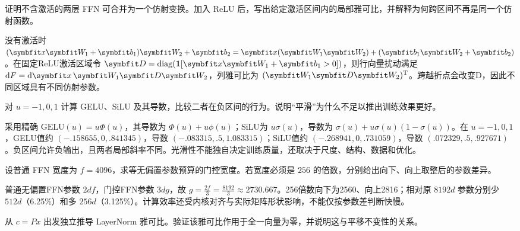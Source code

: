
\begin{exercises}
\begin{exercise} 证明不含激活的两层 FFN 可合并为一个仿射变换。加入 ReLU 后，写出给定激活区间内的局部雅可比，并解释为何跨区间不再是同一个仿射函数。

\begin{solution}
没有激活时 $(\vect{x}\mat{W}_1+\vect{b}_1)\mat{W}_2+\vect{b}_2=\vect{x}(\mat{W}_1\mat{W}_2)+(\vect{b}_1\mat{W}_2+\vect{b}_2)$。在固定ReLU激活区域令 $\mat{D}=\operatorname{diag}(\mathbf1[\vect{x}\mat{W}_1+\vect{b}_1>0])$，则行向量扰动满足 $\dif F=\dif \vect{x}\,\mat{W}_1\mat{D}\mat{W}_2$，列雅可比为 $(\mat{W}_1\mat{D}\mat{W}_2)^{\mathrm{T}}$。跨越折点会改变D，因此不同区域具有不同仿射参数。
\end{solution}
\end{exercise}

\begin{exercise} 对 $u=-1,0,1$ 计算 GELU、SiLU 及其导数，比较二者在负区间的行为。说明“平滑”为什么不足以推出训练效果更好。

\begin{solution}
采用精确 $\mathrm{GELU}(u)=u\Phi(u)$，其导数为 $\Phi(u)+u\phi(u)$；SiLU为 $u\sigma(u)$，导数为 $\sigma(u)+u\sigma(u)(1-\sigma(u))$。在 $u=-1,0,1$，GELU值约 $(-.158655,0,.841345)$，导数 $(-.083315,.5,1.083315)$；SiLU值约 $(-.268941,0,.731059)$，导数 $(.072329,.5,.927671)$。负区间允许负输出，且两者局部斜率不同。光滑性不能独自决定训练质量，还取决于尺度、结构、数据和优化。
\end{solution}
\end{exercise}

\begin{exercise}\optional 设普通 FFN 宽度为 $f=\num{4096}$，求等无偏置参数预算的门控宽度。若宽度必须是 $256$ 的倍数，分别给出向下、向上取整后的参数差异。

\begin{solution}
普通无偏置FFN参数 $2df$，门控FFN参数 $3dg$，故 $g=\frac{2f}{3}=\frac{8192}{3}\approx2730.667$。256倍数向下为2560、向上2816；相对原 $8192d$ 参数分别少 $512d$（6.25\%）和多 $256d$（3.125\%）。计算效率还受内核对齐与实际矩阵形状影响，不能仅按参数差判断快慢。
\end{solution}
\end{exercise}

\begin{exercise} 从 $c=Px$ 出发独立推导 LayerNorm 雅可比。验证该雅可比作用于全一向量为零，并说明这与平移不变性的关系。


\end{exercise}
\end{exercises}
